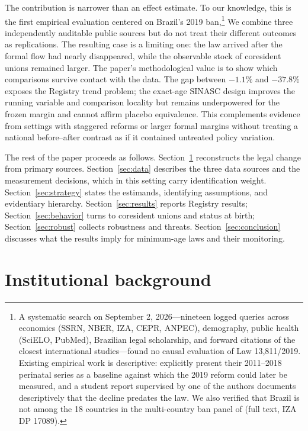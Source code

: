 \documentclass[12pt]{article}
\begin{document}
The contribution is narrower than an effect estimate. To our knowledge, this is the first
empirical evaluation centered on Brazil's 2019 ban,\footnote{A systematic search on September 2,
2026---nineteen logged
queries across economics (SSRN, NBER, IZA, CEPR, ANPEC), demography, public health
(SciELO, PubMed), Brazilian legal scholarship, and forward citations of the closest
international studies---found no causal evaluation of Law 13,811/2019. Existing
empirical work is descriptive: \citet{Urquia2022} explicitly present their 2011--2018
perinatal series as a baseline against which the 2019 reform could later be measured,
and a student report supervised by one of the authors \citep{Faria2025} documents
descriptively that the decline predates the law. We also verified that Brazil is not
among the 18 countries in the multi-country ban panel of \citet{LeMolinaIbukaGoto2025}
(full text, IZA DP 17089).} We combine three independently auditable public sources but
do not treat their different outcomes as replications. The resulting case is a limiting
one: the law arrived after the formal flow had nearly disappeared, while the observable
stock of coresident unions remained larger. The paper's methodological value is to show
which comparisons survive contact with the data. The gap between $-1.1\%$ and
$-37.8\%$ exposes the Registry trend problem; the exact-age SINASC design improves the
running variable and comparison locality but remains underpowered for the frozen margin
and cannot affirm placebo equivalence. This complements evidence from settings with
staggered reforms or larger formal margins \citep{BellesObreroLombardi2023,CollinTalbot2023}
without treating a national before--after contrast as if it contained untreated policy
variation.

The rest of the paper proceeds as follows. Section~\ref{sec:background} reconstructs the
legal change from primary sources. Section~\ref{sec:data} describes the three data
sources and the measurement decisions, which in this setting carry identification weight.
Section~\ref{sec:strategy} states the estimands, identifying assumptions, and evidentiary
hierarchy. Section~\ref{sec:results} reports Registry results;
Section~\ref{sec:behavior} turns to coresident unions and status at birth;
Section~\ref{sec:robust} collects robustness and threats. Section~\ref{sec:conclusion}
discusses what the results imply for minimum-age laws and their monitoring.

\section{Institutional background}\label{sec:background}
\end{document}
